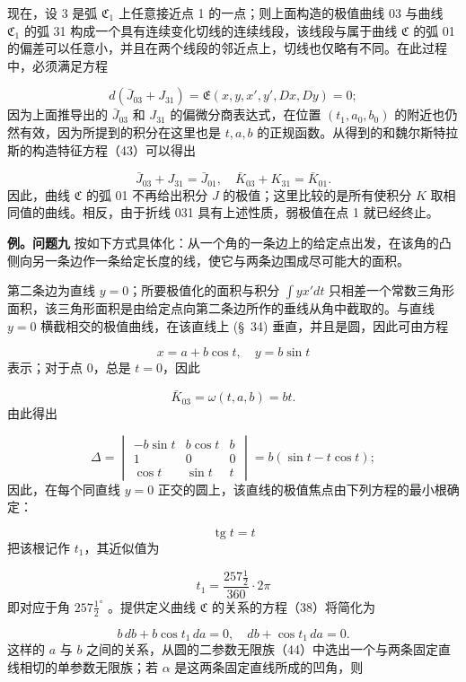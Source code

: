 \documentclass[11pt,a4paper,leqno]{article}
\newcommand{\tg}{\operatorname{tg}}
\begin{document}
现在，设 3 是弧 $\mathfrak{C}_1$ 上任意接近点 1 的一点；则上面构造的极值曲线 03
与曲线 $\mathfrak{C}_1$ 的弧 31 构成一个具有连续变化切线的连续线段，该线段与属于曲线 $\mathfrak{C}$ 的弧 01 的偏差可以任意小，并且在两个线段的邻近点上，切线也仅略有不同。在此过程中，必须满足方程

\[
d(\bar J_{03}+J_{31})=\mathfrak{E}(x,y,x',y',Dx,Dy)=0;
\]
因为上面推导出的 $\bar J_{03}$ 和 $J_{31}$ 的偏微分商表达式，在位置 $(t_1,a_0,b_0)$ 的附近也仍然有效，因为所提到的积分在这里也是 $t,a,b$ 的正规函数。从得到的和魏尔斯特拉斯的构造特征方程（43）可以得出

\[
\bar J_{03}+J_{31}=\bar J_{01},
\quad \bar K_{03}+K_{31}=\bar K_{01}.
\]
因此，曲线 $\mathfrak{C}$ 的弧 01 不再给出积分 $J$ 的极值；这里比较的是所有使积分 $K$ 取相同值的曲线。相反，由于折线 031 具有上述性质，弱极值在点 1 就已经终止。

\noindent\textbf{例。问题九} 按如下方式具体化：从一个角的一条边上的给定点出发，在该角的凸侧向另一条边作一条给定长度的线，使它与两条边围成尽可能大的面积。

第二条边为直线 $y=0$；所要极值化的面积与积分 $\int yx' dt$ 只相差一个常数三角形面积，该三角形面积是由给定点向第二条边所作的垂线从角中截取的。与直线 $y=0$ 横截相交的极值曲线，在该直线上 (\S~34) 垂直，并且是圆，因此可由方程

\begin{equation}\tag{44}
x=a+b\cos t,
\quad y=b\sin t
\end{equation}
表示；对于点 0，总是 $t=0$，因此

\[
\bar K_{03}=\omega(t,a,b)=bt.
\]
由此得出

\[
\Delta=\begin{vmatrix}
-b\sin t&b\cos t&b\\
1&0&0\\
\cos t&\sin t&t
\end{vmatrix}=b(\sin t-t\cos t);
\]
因此，在每个同直线 $y=0$ 正交的圆上，该直线的极值焦点由下列方程的最小根确定：

\[
\tg t=t
\]
把该根记作 $t_1$，其近似值为

\[
t_1=\frac{257\frac{1}{2}}{360}\cdot 2\pi
\]
即对应于角 $257\frac{1}{2}^{\circ}$ 。提供定义曲线 $\mathfrak{C}$ 的关系的方程（38）将简化为

\[
b\,db+b\cos t_1\,da=0,
\quad db+\cos t_1\,da=0.
\]
这样的 $a$ 与 $b$ 之间的关系，从圆的二参数无限族（44）中选出一个与两条固定直线相切的单参数无限族；若 $\alpha$ 是这两条固定直线所成的凹角，则
\end{document}

